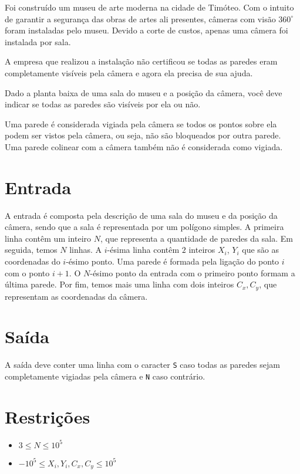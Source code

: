 Foi construído um museu de arte moderna na cidade de Timóteo. Com o intuito de garantir a segurança das obras
de artes ali presentes, câmeras com visão $360 ^{\circ}$ foram instaladas pelo museu.
Devido a corte de custos, apenas uma câmera foi instalada por sala.

A empresa que realizou a instalação não certificou se todas as paredes eram completamente visíveis pela câmera e agora ela precisa de sua ajuda.

Dado a planta baixa de uma sala do museu e a posição da câmera, você deve indicar se todas as paredes são visíveis por ela ou não.

Uma parede é considerada vigiada pela câmera se todos os pontos sobre ela podem ser vistos pela câmera, ou seja, não são bloqueados por outra parede.
Uma parede colinear com a câmera também não é considerada como vigiada.


\section*{Entrada}

A entrada é composta pela descrição de uma sala do museu e da posição da câmera, sendo que a sala é
representada por um polígono simples.
A primeira linha contêm um inteiro $N$, que representa a quantidade de paredes da sala.
Em seguida, temos $N$ linhas. A $i$-ésima linha contêm $2$ inteiros $X_i$, $Y_i$ que são as coordenadas do $i$-ésimo ponto.
Uma parede é formada pela ligação do ponto $i$ com o ponto $i+1$. O $N$-ésimo ponto da entrada com o primeiro ponto formam a última parede.
Por fim, temos mais uma linha com dois inteiros $C_x, C_y$, que representam as coordenadas da câmera.

\section*{Saída}

A saída deve conter uma linha com o caracter \texttt{S} caso todas as paredes sejam completamente vigiadas pela câmera e \texttt{N} caso contrário.

\section*{Restrições}

\begin{itemize}
    \item $3 \leq N \leq 10^5 $
    \item $-10^5 \leq X_i, Y_i, C_x, C_y \leq 10^5 $
\end{itemize}

